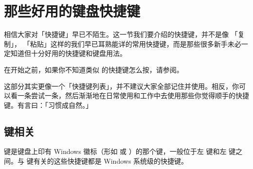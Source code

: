 \chapter{那些好用的键盘快捷键}
\label{cha:shortcut-keys}

\begin{intro}
  相信大家对「快捷键」早已不陌生。这一节我们要介绍的快捷键，并不是像  「复制」， 「粘贴」这样的我们早已耳熟能详的常用快捷键，而是那些很多新手未必一定知道但十分好用的快捷键和键盘用法。
\end{intro}

在开始之前，如果你不知道类似  的快捷键怎么按，请参阅。

这部分其实更像一个「快捷键列表」，并不建议大家全部记住并使用。相反，你可以看一条尝试一条，然后渐渐地在日常使用和工作中去使用那些你觉得顺手的快捷键。有言曰：「习惯成自然。」

\section{\texorpdfstring{\keys{\protect\Windows\hspace*{.15em}} 键相关}{Windows 键相关}}

\keys{\Windows} 键是键盘上印有 Windows 徽标（形如 \Windows{} 或 \WindowsTen）的那个键，一般位于左  键和左  键之间。与 \keys{\Windows} 键有关的这些快捷键都是 Windows 系统级的快捷键。

